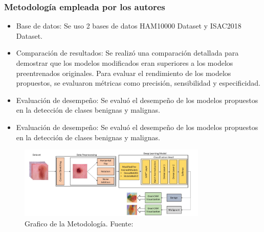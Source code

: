\subsubsection{Metodología empleada por los autores}
\newcommand{\TISCone}{Base de datos: Se uso 2 bases de datos HAM10000 Dataset y ISAC2018 Dataset.
}
\newcommand{\TISCtwo}{Selección de modelos pre-entrenados: Se seleccion los modelo MobileNetV2 y DenseNet201. Los cuales fueron modificados mediante el aumento de mayor cantidad de capas convolucionales(tres capas) para para mejorar su desempeño en la clasificación de lesiones.
}

\newcommand {\TISCthree} {Comparación de resultados: Se realizó una comparación detallada para demostrar que los modelos modificados eran superiores a los modelos preentrenados originales. Para evaluar el rendimiento de los modelos propuestos, se evaluaron métricas como precisión, sensibilidad y especificidad.}

\newcommand {\TISCfour} {Evaluación de desempeño: Se evaluó el desempeño de los modelos propuestos en la detección de clases benignas y malignas.}

\newcommand {\TISCfive} {Comparación con otras técnicas: Se compararon los resultados obtenidos con otras técnicas presentes en la literatura para demostrar la eficacia y el rendimiento superior de los modelos propuestos en la clasificación de lesiones de cáncer de piel.}

\begin{itemize}
	\item \TISCone
	\item \TISCthree
	\item \TISCfour
	\item \TISCfour
	
\end{itemize}


\begin{figure}[h]
	\begin{center}
		\includegraphics[width=0.8\textwidth]{2/figuras/metodo_ultimo.png}
		\caption{Grafico de la Metodología. Fuente: \cite{goceri2023classification}}
		\label{1:fig 4}
	\end{center}
\end{figure}




